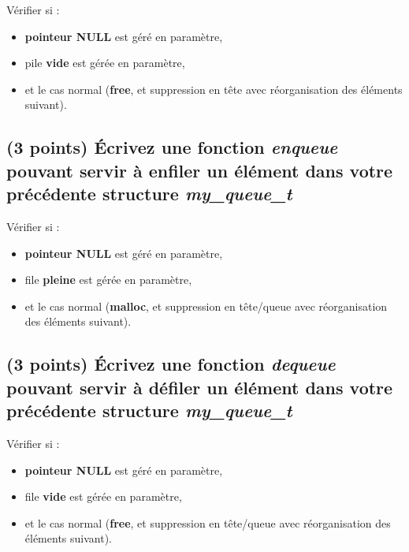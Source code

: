 \documentclass[11pt,a4paper]{article}
\begin{document}
\bigskip

\begin{center}
Vérifier si :
\begin{itemize}
\item \textbf{pointeur NULL} est géré en paramètre,
\item pile \textbf{vide} est gérée en paramètre,
\item et le cas normal (\textbf{free}, et suppression en tête avec réorganisation des éléments suivant).
\end{itemize}
\end{center}

\bigskip

\subsection{(3 points) \'Ecrivez une fonction \og \textit{enqueue} \fg{} pouvant servir à enfiler un élément dans votre précédente structure \og \textit{my\_queue\_t} \fg{} }

\bigskip

\begin{center}
Vérifier si :
\begin{itemize}
\item \textbf{pointeur NULL} est géré en paramètre,
\item file \textbf{pleine} est gérée en paramètre,
\item et le cas normal (\textbf{malloc}, et suppression en tête/queue  avec réorganisation des éléments suivant).
\end{itemize}
\end{center}

\bigskip

\subsection{(3 points) \'Ecrivez une fonction \og \textit{dequeue} \fg{} pouvant servir à défiler un élément dans votre précédente structure \og \textit{my\_queue\_t} \fg{} }

\bigskip

\begin{center}
Vérifier si :
\begin{itemize}
\item \textbf{pointeur NULL} est géré en paramètre,
\item file \textbf{vide} est gérée en paramètre,
\item et le cas normal (\textbf{free}, et suppression en tête/queue  avec réorganisation des éléments suivant).
\end{itemize}
\end{center}

\bigskip
\end{document}

